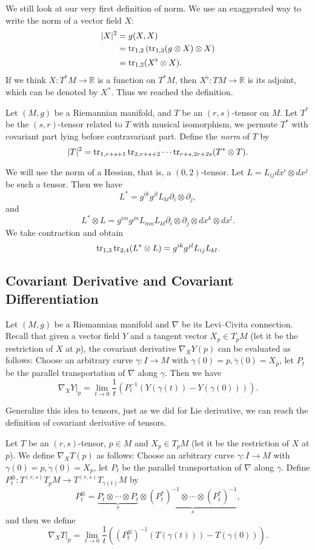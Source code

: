 We still look at our very first definition of norm.
We use an exaggerated way to write the norm of a vector field $X$:
\begin{align*}
    |X|^2&=g(X,X)\\
    &=\operatorname{tr}_{1,2}\left(\operatorname{tr}_{1,3}(g\otimes X)\otimes X\right)\\
    &=\operatorname{tr}_{1,2}(X^\flat\otimes X).
\end{align*}
If we think $X:T^*M\to\mathbb{R}$ is a function on $T^*M$, then $X^\flat:TM\to\mathbb{R}$ is its adjoint, which can be denoted by $X^*$.
Thus we reached the definition.

\begin{defn}
    Let $(M,g)$ be a Riemannian manifold, and $T$ be an $(r,s)$-tensor on $M$.
    Let $T^*$ be the $(s,r)$-tensor related to $T$ with musical isomorphism, we permute $T^*$ with covariant part lying before contravariant part.
    Define the \emph{norm} of $T$ by
    \[|T|^2=\operatorname{tr}_{1,r+s+1}\operatorname{tr}_{2,r+s+2}\cdots\operatorname{tr}_{r+s,2r+2s}(T^*\otimes T).\]
\end{defn}

\begin{eg}
    We will use the norm of a Hessian, that is, a $(0,2)$-tensor.
    Let $L=L_{ij}dx^i\otimes dx^j$ be such a tensor.
    Then we have
    \[L^*=g^{ik}g^{jl}L_{kl}\partial_i\otimes\partial_j,\]
    and
    \[L^*\otimes L=g^{im}g^{jn}L_{mn}L_{kl}\partial_i\otimes\partial_j\otimes dx^k\otimes dx^l.\]
    We take contraction and obtain
    \[\operatorname{tr}_{1,3}\operatorname{tr}_{2,4}(L^*\otimes L)=g^{ik}g^{jl}L_{ij}L_{kl}.\]
\end{eg}

\subsection{Covariant Derivative and Covariant Differentiation}

Let $(M,g)$ be a Riemannian manifold and $\nabla$ be its Levi--Civita connection.
Recall that given a vector field $Y$ and a tangent vector $X_p\in T_pM$ (let it be the restriction of $X$ at $p$), the covariant derivative $\nabla_XY(p)$ can be evaluated as follows:
Choose an arbitrary curve $\gamma:I\to M$ with $\gamma(0)=p,\dot\gamma(0)=X_p$, let $P_t$ be the parallel transportation of $\nabla$ along $\gamma$.
Then we have
\[\nabla_XY|_p=\lim_{t\to 0}\frac{1}{t}\left(P^{-1}_t(Y(\gamma(t))-Y(\gamma(0)))\right).\]

Generalize this idea to tensors, just as we did for Lie derivative, we can reach the definition of covariant derivative of tensors.
\begin{defn}
    Let $T$ be an $(r,s)$-tensor, $p\in M$ and $X_p\in T_pM$ (let it be the restriction of $X$ at $p$).
    We define $\nabla_XT(p)$ as follows:
    Choose an arbitrary curve $\gamma:I\to M$ with $\gamma(0)=p,\dot\gamma(0)=X_p$, let $P_t$ be the parallel transportation of $\nabla$ along $\gamma$.
    Define $P^\otimes_t:T^{(r,s)}T_{p}M\to T^{(r,s)}T_{\gamma(t)}M$ by
    \[P^\otimes_t=\underbrace{P_t\otimes\cdots\otimes P_t}_{r}\otimes\underbrace{(P^*_t)^{-1}\otimes\cdots\otimes(P^*_t)^{-1}}_{s},\]
    and then we define
    \[\nabla_XT|_p=\lim_{t\to 0}\frac{1}{t}\left((P^\otimes_t)^{-1}(T(\gamma(t)))-T(\gamma(0))\right).\]
\end{defn}

